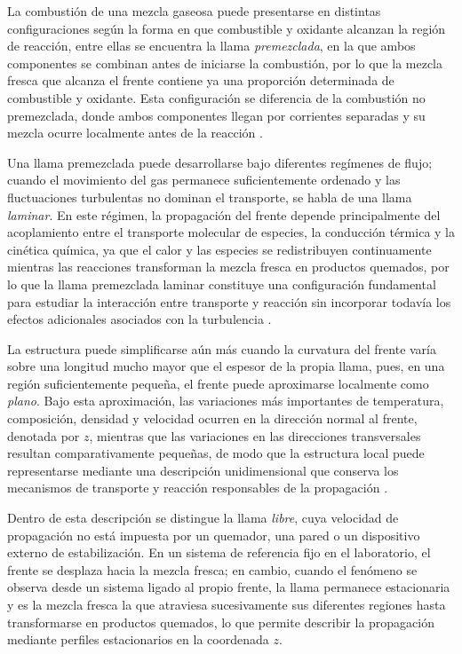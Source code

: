 \documentclass[12pt,a4paper,twoside,openany]{book}
\begin{document}
La combustión de una mezcla gaseosa puede presentarse en distintas
configuraciones según la forma en que combustible y oxidante alcanzan la región
de reacción, entre ellas se encuentra la llama \emph{premezclada}, en la que
ambos componentes se combinan antes de iniciarse la combustión, por lo que la
mezcla fresca que alcanza el frente contiene ya una proporción determinada de
combustible y oxidante. Esta configuración se diferencia de la combustión no
premezclada, donde ambos componentes llegan por corrientes separadas y su mezcla
ocurre localmente antes de la reacción
\cite{Peters1984,Smooke1991}.

Una llama premezclada puede desarrollarse bajo diferentes regímenes de flujo;
cuando el movimiento del gas permanece suficientemente ordenado y las
fluctuaciones turbulentas no dominan el transporte, se habla de una llama
\emph{laminar}. En este régimen, la propagación del frente depende
principalmente del acoplamiento entre el transporte molecular de especies, la
conducción térmica y la cinética química, ya que el calor y las especies se
redistribuyen continuamente mientras las reacciones transforman la mezcla
fresca en productos quemados, por lo que la llama premezclada laminar
constituye una configuración fundamental para estudiar la interacción entre
transporte y reacción sin incorporar todavía los efectos adicionales asociados
con la turbulencia \cite{Peters1984,Smooke1991}.

La estructura puede simplificarse aún más cuando la curvatura del frente varía
sobre una longitud mucho mayor que el espesor de la propia llama, pues, en una
región suficientemente pequeña, el frente puede aproximarse localmente como
\emph{plano}. Bajo esta aproximación, las variaciones más importantes de
temperatura, composición, densidad y velocidad ocurren en la dirección normal al
frente, denotada por \(z\), mientras que las variaciones en las direcciones
transversales resultan comparativamente pequeñas, de modo que la estructura
local puede representarse mediante una descripción unidimensional que conserva
los mecanismos de transporte y reacción responsables de la propagación
\cite{Peters1984,Poinsot2005}.

Dentro de esta descripción se distingue la llama \emph{libre}, cuya velocidad
de propagación no está impuesta por un quemador, una pared o un dispositivo
externo de estabilización. En un sistema de referencia fijo en el laboratorio,
el frente se desplaza hacia la mezcla fresca; en cambio, cuando el fenómeno se
observa desde un sistema ligado al propio frente, la llama permanece
estacionaria y es la mezcla fresca la que atraviesa sucesivamente sus diferentes
regiones hasta transformarse en productos quemados, lo que permite describir la
propagación mediante perfiles estacionarios en la coordenada \(z\).
\end{document}
